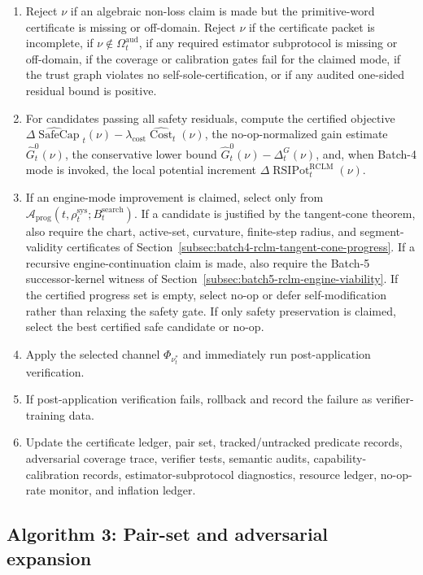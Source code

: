 \documentclass[11pt,a4paper]{article}
\newcommand{\Acal}{\mathcal A}
\newcommand{\RCLM}{\mathrm{RCLM}}
\newcommand{\sys}{\mathrm{sys}}
\newcommand{\aud}{\mathrm{aud}}
\newcommand{\SafeCap}{\operatorname{SafeCap}}
\newcommand{\Cost}{\operatorname{Cost}}
\newcommand{\search}{\mathrm{search}}
\newcommand{\cost}{\mathrm{cost}}
\newcommand{\RSIPot}{\operatorname{RSIPot}}
\begin{document}
\begin{enumerate}[label=\textbf{S\arabic*.}, leftmargin=2em]
    \item Reject \(\nu\) if an algebraic non-loss claim is made but the primitive-word certificate is missing or off-domain. Reject \(\nu\) if the certificate packet is incomplete, if \(\nu\notin\Omega_t^{\aud}\), if any required estimator subprotocol is missing or off-domain, if the coverage or calibration gates fail for the claimed mode, if the trust graph violates no self-sole-certification, or if any audited one-sided residual bound is positive.
    \item For candidates passing all safety residuals, compute the certified objective \(\widehat{\Delta\SafeCap}_t(\nu)-\lambda_{\cost}\widehat{\Cost}_t(\nu)\), the no-op-normalized gain estimate \(\widehat G_t^0(\nu)\), the conservative lower bound \(\widehat G_t^0(\nu)-\Delta_t^G(\nu)\), and, when Batch-4 mode is invoked, the local potential increment \(\Delta\RSIPot_t^{\RCLM}(\nu)\).
    \item If an engine-mode improvement is claimed, select only from \(\Acal_{\mathrm{prog}}(t,\rho_t^{\sys};B_t^{\search})\).  If a candidate is justified by the tangent-cone theorem, also require the chart, active-set, curvature, finite-step radius, and segment-validity certificates of Section~\ref{subsec:batch4-rclm-tangent-cone-progress}. If a recursive engine-continuation claim is made, also require the Batch-5 successor-kernel witness of Section~\ref{subsec:batch5-rclm-engine-viability}.  If the certified progress set is empty, select no-op or defer self-modification rather than relaxing the safety gate. If only safety preservation is claimed, select the best certified safe candidate or no-op.
    \item Apply the selected channel \(\Phi_{\nu_t^*}\) and immediately run post-application verification.
    \item If post-application verification fails, rollback and record the failure as verifier-training data.
    \item Update the certificate ledger, pair set, tracked/untracked predicate records, adversarial coverage trace, verifier tests, semantic audits, capability-calibration records, estimator-subprotocol diagnostics, resource ledger, no-op-rate monitor, and inflation ledger.
\end{enumerate}

\subsection{Algorithm 3: Pair-set and adversarial expansion}
\end{document}
